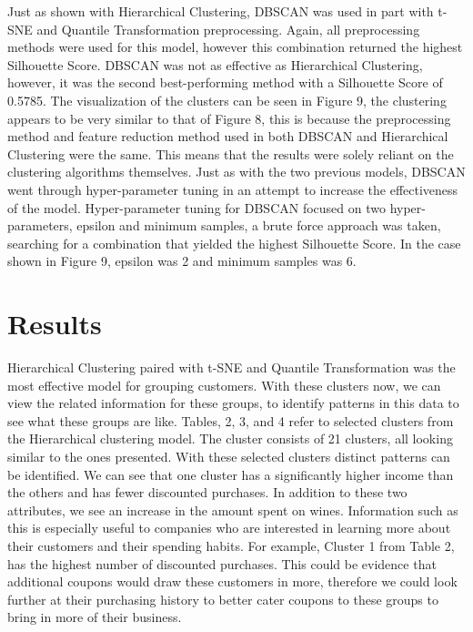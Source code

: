 \documentclass[twocolumn]{article}
\begin{document}
Just as shown with Hierarchical Clustering, DBSCAN was used in part with t-SNE and Quantile Transformation preprocessing. Again, all preprocessing methods were used for this model, however this combination returned the highest Silhouette Score. DBSCAN was not as effective as Hierarchical Clustering, however, it was the second best-performing method with a Silhouette Score of 0.5785. The visualization of the clusters can be seen in Figure 9, the clustering appears to be very similar to that of Figure 8, this is because the preprocessing method and feature reduction method used in both DBSCAN and Hierarchical Clustering were the same. This means that the results were solely reliant on the clustering algorithms themselves. Just as with the two previous models, DBSCAN went through hyper-parameter tuning in an attempt to increase the effectiveness of the model. Hyper-parameter tuning for DBSCAN focused on two hyper-parameters, epsilon and minimum samples, a brute force approach was taken, searching for a combination that yielded the highest Silhouette Score. In the case shown in Figure 9, epsilon was 2 and minimum samples was 6.

\section{Results}

Hierarchical Clustering paired with t-SNE and Quantile Transformation was the most effective model for grouping customers. With these clusters now, we can view the related information for these groups, to identify patterns in this data to see what these groups are like. Tables, 2, 3, and 4 refer to selected clusters from the Hierarchical clustering model. The cluster consists of 21 clusters, all looking similar to the ones presented. With these selected clusters distinct patterns can be identified. We can see that one cluster has a significantly higher income than the others and has fewer discounted purchases. In addition to these two attributes, we see an increase in the amount spent on wines. Information such as this is especially useful to companies who are interested in learning more about their customers and their spending habits. For example, Cluster 1 from Table 2, has the highest number of discounted purchases. This could be evidence that additional coupons would draw these customers in more, therefore we could look further at their purchasing history to better cater coupons to these groups to bring in more of their business.
\end{document}

